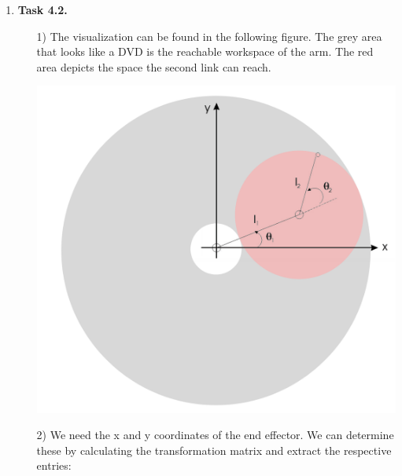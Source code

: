 \documentclass[a4paper,11pt]{article}
\begin{document}
\begin {enumerate}
		
	\item[\textbf{Task 4.2.}]
		\begin{enumerate}
			\item[1)] The visualization can be found in the following figure. The grey area that looks like a DVD is the reachable workspace of the arm. The red area depicts the space the second link can reach.
			\begin{center}
				\includegraphics[scale=0.2]{4-2-1.png}
			\end{center}
			
			\item[2)]
				We need the x and y coordinates of the end effector. We can determine these by calculating the transformation matrix and extract the respective entries:
				

\end{enumerate}
\end{enumerate}
\end{document}
